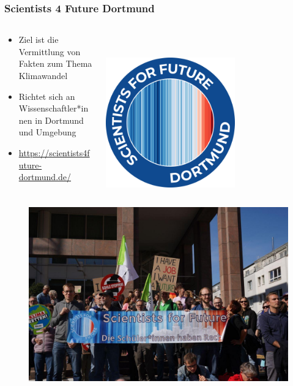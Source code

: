 \begin{frame}
\frametitle{Scientists 4 Future Dortmund}
\begin{columns}[c] %
 \begin{column}{.78\textwidth}
	 \begin{itemize}
		\item Ziel ist die Vermittlung von Fakten zum Thema Klimawandel
		\item Richtet sich an Wissenschaftler*innen in Dortmund und Umgebung
	 	\item \url{https://scientists4future-dortmund.de/}
	 \end{itemize}
 \end{column}%
 \hfill%
 \begin{column}{.28\textwidth}
	 \centering
	 ~\\~\\
		 \includegraphics[width=0.625\textwidth]{bilder/s4f_logo_dortmund.png}
 \end{column}%
\end{columns}
\begin{columns}[c] %
 \begin{column}{.48\textwidth}
	 \centering
	 \begin{figure}
		 \centering
		 \includegraphics[width=\textwidth]{bilder/demo.jpg}

\end{figure}
\end{column}
\end{columns}
\end{frame}
